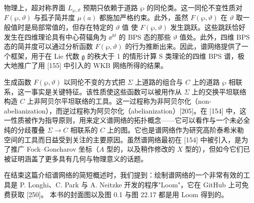 物理上，超对称界面 $L_{\wp,\vartheta}$ 预期只依赖于道路 $\wp$ 的同伦类。这一同伦不变性质对 $F(\wp,\vartheta)$ 与孤子简并度 $\mu(a)$ 都施加严格约束。此外，虽然 $F(\wp,\vartheta)$ 在 $\vartheta$ 取一般值时是局部常值的，但存在特定的 $\vartheta$ 值
使 $F(\wp,\vartheta)$ 发生跳跃。这些跳跃恰好发生在四维理论具有中心荷辐角为 $\ee^{\ii\vartheta}$ 的 BPS 态的那些 $\vartheta$ 值处。此外，四维 BPS 态的简并度可以通过分析函数 $F(\wp,\vartheta)$ 的行为推断出来。因此，谱网络提供了一个框架，用于在 Lie 代数 $\mathfrak{g}$ 的秩大于 1 的情形计算 S 类理论的四维 BPS 谱，极大地推广了用 [155] 中引入的 WKB 网络所得的结果。

生成函数 $F(\wp,\vartheta)$ 以同伦不变的方式把 $\Sigma$ 上道路的组合与 $C$ 上的道路 $\wp$ 相联系，这一事实是关键特征。该性质使这些函数可以被用作从 $\Sigma$ 上的交换平坦联络构造 $C$ 上非阿贝尔平坦联络的工具。这一过程称为非阿贝尔化（non-abelianization），而逆过程称为阿贝尔化（abelianization）[205]。在 [154] 中，这一性质被作为指导原则，用来定义谱网络的拓扑概念——它可以看作与一个未必全纯的分歧覆叠 $\Sigma\to C$ 相联系的 $C$ 上的图。它也是谱网络作为研究高阶泰希米勒空间的工具而日益受到关注的主要原因。虽然谱网络最初在 [154] 中被引入，是为了推广 Fock--Goncharov 坐标（$A$ 型的，以及稍作修改的 $X$ 型的），但如今它们已被证明涵盖了更多具有几何与物理意义的话题。

在结束这篇介绍谱网络的简短概述时，我们提到：绘制谱网络的一个非常有效的工具是 P. Longhi、C. Park 与 A. Neitzke 开发的程序"Loom"，它在 GitHub 上可免费获取 [250]。
本书的封面图以及图 0.1 与图 22.17 都是用 Loom 得到的。

